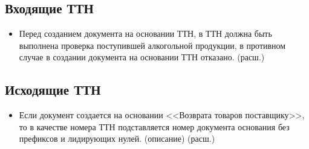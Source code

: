 \subsection{Входящие ТТН}

\begin{itemize}
	\item Перед созданием документа на основании ТТН, в ТТН должна быть выполнена проверка поступившей алкогольной продукции, в противном случае в создании документа на основании ТТН отказано.
    (расш.)
\end{itemize}


\subsection{Исходящие ТТН}

\begin{itemize}
	\item Если документ создается на основании <<Возврата товаров поставщику>>, то в качестве номера ТТН подставляется номер документа основания без префиксов и лидирующих нулей.
	(описание) 
	(расш.)
\end{itemize}


